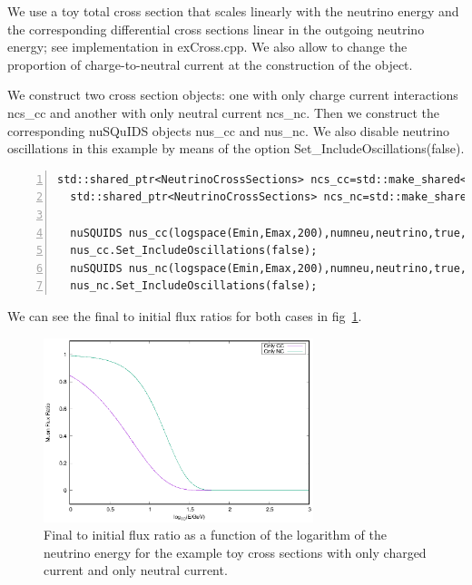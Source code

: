 \documentclass[3p,12pt]{elsarticle}
\newcommand{\ttf}{\ttfamily}
\begin{document}
We use a toy total cross section that scales linearly with
the neutrino energy and the corresponding differential cross sections
linear in the outgoing neutrino energy; see implementation in {\ttf
  exCross.cpp}. We also allow to change the proportion of charge-to-neutral
  current at the construction of the object.


We construct two cross section objects: one with only charge current  interactions
{\ttf ncs\_cc} and another with only neutral current {\ttf
  ncs\_nc}. Then we construct the corresponding nuSQuIDS objects {\ttf nus\_cc} and {\ttf nus\_nc}.
We also disable neutrino oscillations in this example by means of the
option {\ttf Set\_IncludeOscillations(false)}.

\begin{lstlisting}[frame=leftline, numbers =  
  left,breaklines=true,label = ex:sin1]
  std::shared_ptr<NeutrinoCrossSections> ncs_cc=std::make_shared<LinearCrossSections>(0.0);
  std::shared_ptr<NeutrinoCrossSections> ncs_nc=std::make_shared<LinearCrossSections>(1.0);

  nuSQUIDS nus_cc(logspace(Emin,Emax,200),numneu,neutrino,true,ncs_cc);
  nus_cc.Set_IncludeOscillations(false);
  nuSQUIDS nus_nc(logspace(Emin,Emax,200),numneu,neutrino,true,ncs_nc);
  nus_nc.Set_IncludeOscillations(false);
\end{lstlisting}


We can see the final to initial flux ratios for both cases in fig~\ref{fig:crossext}.

\begin{figure}[h!]
  \label{fig:crossext}
  \centering
  \includegraphics[width=0.7\textwidth]{fig/crossext.eps} 
  \caption{Final to initial flux ratio as a function of the logarithm
    of the neutrino energy for the example toy cross sections with
    only charged current and only neutral current.} 
\end{figure}
\end{document}
